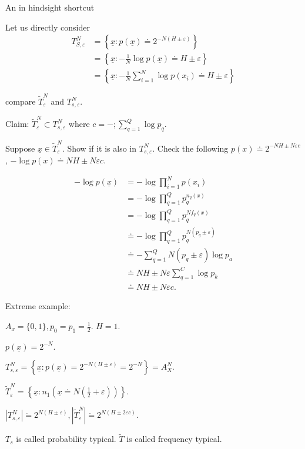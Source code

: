 \documentclass{report}
\newcommand{\set}[1]{\left\lbrace #1 \right\rbrace}
\theoremstyle{definition}
\theoremstyle{remark}
\numberwithin{equation}{section}
\begin{document}
An in hindsight shortcut

Let us directly consider \begin{align*}
  T_{S, \varepsilon}^N & = \set{\underline{x}: p(\underline{x}) \doteq 2^{-N (H\pm\varepsilon)}} \\
  & = \set{\underline{x}: -\frac{1}{N}\log p(\underline{x}) \doteq H\pm\varepsilon} \\
  & = \set{\underline{x}: -\frac{1}{N}\sum_{i=1}^N\log p(x_i) \doteq H\pm\varepsilon}
\end{align*}

compare $\tilde{T}_\varepsilon^N$ and $T^N_{s, \varepsilon}$.

Claim: $\tilde{T}_\varepsilon^N \subset T^N_{s, \varepsilon}$ where $c = -;\sum_{q=1}^Q \log p_q$.

Suppose $\underline{x} \in \tilde{T}_\varepsilon^N$. Show if it is also in $T_{s, \varepsilon}^N$. Check the following $p(x) \doteq 2^{-NH \pm N\varepsilon c}$, $-\log p(x) \doteq NH \pm N\varepsilon c$.

\begin{align*}
  -\log p(\underline{x}) & = -\log\prod_{i=1}^N p(x_i) \\
  & = -\log \prod_{q=1}^Q p_q^{n_q(x)} \\
  & = -\log \prod_{q=1}^Q p_q^{Nf_q(x)} \\
  & \doteq -\log \prod_{q=1}^Q p_q^{N(p_q \pm \varepsilon)} \\
  & \doteq -\sum_{q=1}^Q N(p_q \pm \varepsilon) \log p_a \\
  & \doteq NH \pm N\varepsilon\sum_{q=1}^C \log p_k \\
  & \doteq NH \pm N\varepsilon c.
\end{align*}

Extreme example:

$A_x = \{0, 1\}, p_0 = p_1 = \frac{1}{2}$. $H = 1$.

$p(\underline{x}) = 2^{-N}$.

$T_{s, \varepsilon}^N = \set{\underline{x}: p(\underline{x}) = 2^{-N(H\pm \varepsilon)} = 2^{-N}} = A_X^N$.

$\tilde{T}_\varepsilon^N = \set{\underline{x}: n_1(\underline{x} \doteq N\left(\frac{1}{2} + \varepsilon\right))}$.

$|T_{s, \varepsilon}^N| \ddot{=} 2^{N(H \pm \varepsilon)}, |\tilde{T}_\varepsilon^N| \ddot{=} 2^{N(H \pm 2 \varepsilon c)}$.

$T_s$ is called probability typical. $\tilde{T}$ is called frequency typical.
\end{document}
